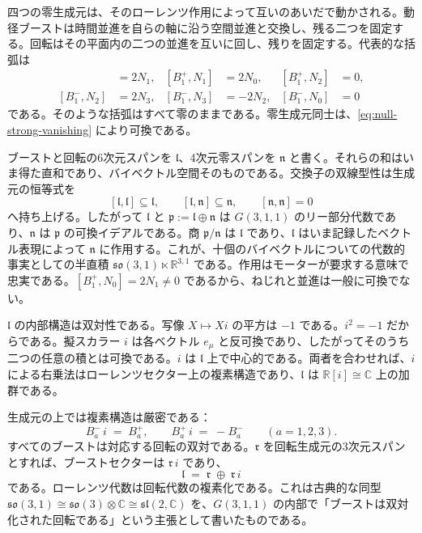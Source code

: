 \documentclass[a4paper]{article}
\begin{document}
四つの零生成元は、そのローレンツ作用によって互いのあいだで動かされる。動径ブーストは時間並進を自らの軸に沿う空間並進と交換し、残る二つを固定する。回転はその平面内の二つの並進を互いに回し、残りを固定する。代表的な括弧は
\begin{align*}
[B^{+}_{1},N_{0}]&=2N_{1},&
[B^{+}_{1},N_{1}]&=2N_{0},&
[B^{+}_{1},N_{2}]&=0,\\
[B^{-}_{1},N_{2}]&=2N_{3},&
[B^{-}_{1},N_{3}]&=-2N_{2},&
[B^{-}_{1},N_{0}]&=0
\end{align*}
である。そのような括弧はすべて零のままである。零生成元同士は、\eqref{eq:null-strong-vanishing} により可換である。

ブーストと回転の6次元スパンを \(\mathfrak{l}\)、4次元零スパンを \(\mathfrak{n}\) と書く。それらの和はいま得た直和であり、バイベクトル空間そのものである。交換子の双線型性は生成元の恒等式を
\[
[\mathfrak{l},\mathfrak{l}]\subseteq\mathfrak{l},\qquad
[\mathfrak{l},\mathfrak{n}]\subseteq\mathfrak{n},\qquad
[\mathfrak{n},\mathfrak{n}]=0
\]
へ持ち上げる。したがって \(\mathfrak{l}\) と \(\mathfrak{p}:=\mathfrak{l}\oplus\mathfrak{n}\) は \(G(3,1,1)\) のリー部分代数であり、\(\mathfrak{n}\) は \(\mathfrak{p}\) の可換イデアルである。商 \(\mathfrak{p}/\mathfrak{n}\) は \(\mathfrak{l}\) であり、\(\mathfrak{l}\) はいま記録したベクトル表現によって \(\mathfrak{n}\) に作用する。これが、十個のバイベクトルについての代数的事実としての半直積 \(\mathfrak{so}(3,1)\ltimes\mathbb{R}^{3,1}\) である。作用はモーターが要求する意味で忠実である。\([B^{+}_{1},N_{0}]=2N_{1}\neq 0\) であるから、ねじれと並進は一般に可換でない。

\(\mathfrak{l}\) の内部構造は双対性である。写像 \(X\mapsto Xi\) の平方は \(-1\) である。\(i^{2}=-1\) だからである。擬スカラー \(i\) は各ベクトル \(e_{\mu}\) と反可換であり、したがってそのうち二つの任意の積とは可換である。\(i\) は \(\mathfrak{l}\) 上で中心的である。両者を合わせれば、\(i\) による右乗法はローレンツセクター上の複素構造であり、\(\mathfrak{l}\) は \(\mathbb{R}[i]\cong\mathbb{C}\) 上の加群である。

生成元の上では複素構造は厳密である：
\[
B^{-}_{a}\,i \;=\; B^{+}_{a},\qquad
B^{+}_{a}\,i \;=\; -B^{-}_{a}\qquad(a=1,2,3).
\]
すべてのブーストは対応する回転の双対である。\(\mathfrak{r}\) を回転生成元の3次元スパンとすれば、ブーストセクターは \(\mathfrak{r}\,i\) であり、
\[
\mathfrak{l} \;=\; \mathfrak{r}\;\oplus\;\mathfrak{r}\,i
\]
である。ローレンツ代数は回転代数の複素化である。これは古典的な同型 \(\mathfrak{so}(3,1)\cong\mathfrak{so}(3)\otimes\mathbb{C}\cong\mathfrak{sl}(2,\mathbb{C})\) を、\(G(3,1,1)\) の内部で「ブーストは双対化された回転である」という主張として書いたものである。
\end{document}
